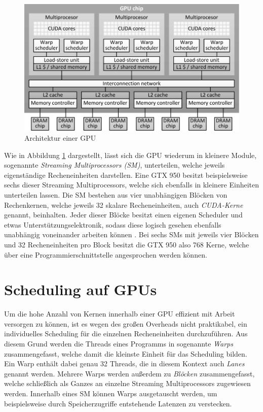 \begin{figure}[ht]
	\includegraphics[]{bilder/gpu_architecture.pdf}
	\caption{Architektur einer GPU \cite{Volkov2016}}
	\label{gpu_architecture}
\end{figure}

Wie in Abbildung \ref{gpu_architecture} dargestellt, lässt sich die GPU wiederum in kleinere Module, sogenannte \emph{Streaming Multiprocessors (SM)}, unterteilen, welche jeweils eigenständige Recheneinheiten darstellen.
Eine GTX 950 besitzt beispielsweise sechs dieser Streaming Multiprocessors, welche sich ebenfalls in kleinere Einheiten unterteilen lassen.
Die SM bestehen aus vier unabhängigen Blöcken von Rechenkernen, welche jeweils 32 skalare Recheneinheiten, auch \emph{CUDA-Kerne} genannt, beinhalten.
Jeder dieser Blöcke besitzt einen eigenen Scheduler und etwas Unterstützungselektronik, sodass diese logisch gesehen ebenfalls unabhängig voneinander arbeiten können \cite{Nvidia2014}.
Bei sechs SMs mit jeweils vier Blöcken und 32 Recheneinheiten pro Block besitzt die GTX 950 also 768 Kerne, welche über eine Programmierschnittstelle angesprochen werden können.

\section{Scheduling auf GPUs}
\label{sec:cuda_scheduling}

Um die hohe Anzahl von Kernen innerhalb einer GPU effizient mit Arbeit versorgen zu können, ist es wegen des großen Overheads nicht praktikabel, ein individuelles Scheduling für die einzelnen Recheneinheiten durchzuführen.
Aus diesem Grund werden die Threads eines Programms in sogenannte \emph{Warps} zusammengefasst, welche damit die kleinste Einheit für das Scheduling bilden.
Ein Warp enthält dabei genau 32 Threads, die in diesem Kontext auch \emph{Lanes} genannt werden.
Mehrere Warps werden außerdem zu \emph{Blöcken} zusammengefasst, welche schließlich als Ganzes an einzelne Streaming Multiprocessors zugewiesen werden.
Innerhalb eines SM können Warps ausgetauscht werden, um beispielsweise durch Speicherzugriffe entstehende Latenzen zu verstecken.

